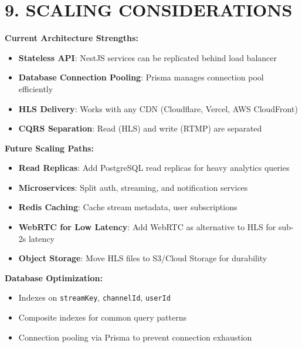 \documentclass[10pt]{article}
\begin{document}
\section*{\color{primary} 9. SCALING CONSIDERATIONS}

\noindent
\begin{tcolorbox}[
  colback=white,
  colframe=warning,
  arc=3pt,
  boxrule=1pt,
  before skip=8pt,
  after skip=8pt
]

\textbf{Current Architecture Strengths:}
\begin{itemize}
\item \textbf{Stateless API}: NestJS services can be replicated behind load balancer
\item \textbf{Database Connection Pooling}: Prisma manages connection pool efficiently
\item \textbf{HLS Delivery}: Works with any CDN (Cloudflare, Vercel, AWS CloudFront)
\item \textbf{CQRS Separation}: Read (HLS) and write (RTMP) are separated
\end{itemize}

\textbf{Future Scaling Paths:}
\begin{itemize}
\item \textbf{Read Replicas}: Add PostgreSQL read replicas for heavy analytics queries
\item \textbf{Microservices}: Split auth, streaming, and notification services
\item \textbf{Redis Caching}: Cache stream metadata, user subscriptions
\item \textbf{WebRTC for Low Latency}: Add WebRTC as alternative to HLS for sub-2s latency
\item \textbf{Object Storage}: Move HLS files to S3/Cloud Storage for durability
\end{itemize}

\textbf{Database Optimization:}
\begin{itemize}
\item Indexes on \texttt{streamKey}, \texttt{channelId}, \texttt{userId}
\item Composite indexes for common query patterns
\item Connection pooling via Prisma to prevent connection exhaustion
\end{itemize}

\end{tcolorbox}
\end{document}
